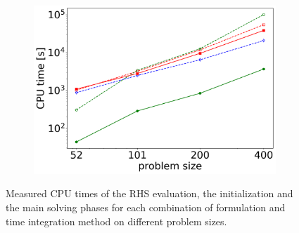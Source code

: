 \begin{figure}[H]
\begin{subfigure}[b]{0.32\textwidth}
		\label{fig:scalabilty_executionTimes__initializationTime}
	\end{subfigure}
	\begin{subfigure}[b]{0.32\textwidth}
		\centering
		\includegraphics[width=1\textwidth]{images/TANDEM_CPU_Time_solving.png}
		\label{fig:scalabilty_executionTimes__solveTime}
	\end{subfigure}
	\caption{Measured CPU times of the RHS evaluation, the initialization and the main solving phases for each combination of formulation and time integration method on different problem sizes.}
	\label{fig:scalabilty_executionTimes}
\end{figure}

